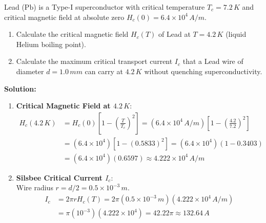 \begin{example}
Lead ($\text{Pb}$) is a Type-I superconductor with critical temperature $T_c = 7.2\,\si{K}$ and critical magnetic field at absolute zero $H_c(0) = 6.4 \times 10^4\,\si{A/m}$.
\begin{enumerate}
    \item Calculate the critical magnetic field $H_c(T)$ of Lead at $T = 4.2\,\si{K}$ (liquid Helium boiling point).
    \item Calculate the maximum critical transport current $I_c$ that a Lead wire of diameter $d = 1.0\,\si{mm}$ can carry at $4.2\,\si{K}$ without quenching superconductivity.
\end{enumerate}

\textbf{Solution:}
\begin{enumerate}
    \item \textbf{Critical Magnetic Field at $4.2\,\si{K}$}:
    \begin{align*}
        H_c(4.2\,\si{K}) &= H_c(0)\left[ 1 - \left(\frac{T}{T_c}\right)^2 \right] = (6.4 \times 10^4\,\si{A/m})\left[ 1 - \left(\frac{4.2}{7.2}\right)^2 \right] \\
        &= (6.4 \times 10^4)[1 - (0.5833)^2] = (6.4 \times 10^4)(1 - 0.3403) \\
        &= (6.4 \times 10^4)(0.6597) \approx 4.222 \times 10^4\,\si{A/m}
    \end{align*}
    
    \item \textbf{Silsbee Critical Current $I_c$}:\\
    Wire radius $r = d/2 = 0.5 \times 10^{-3}\,\si{m}$.
    \begin{align*}
        I_c &= 2\pi r H_c(T) = 2\pi (0.5 \times 10^{-3}\,\si{m})(4.222 \times 10^4\,\si{A/m}) \\
        &= \pi (10^{-3})(4.222 \times 10^4) = 42.22 \pi \approx 132.64\,\si{A}
    \end{align*}
\end{enumerate}
\end{example}

